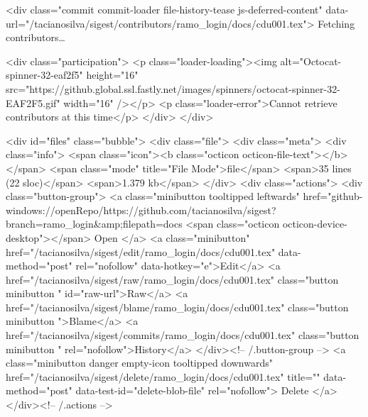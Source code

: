  <div class="commit commit-loader file-history-tease js-deferred-content" data-url="/tacianosilva/sigest/contributors/ramo_login/docs/cdu001.tex">
    Fetching contributors…

    <div class="participation">
      <p class="loader-loading"><img alt="Octocat-spinner-32-eaf2f5" height="16" src="https://github.global.ssl.fastly.net/images/spinners/octocat-spinner-32-EAF2F5.gif" width="16" /></p>
      <p class="loader-error">Cannot retrieve contributors at this time</p>
    </div>
  </div>

<div id="files" class="bubble">
  <div class="file">
    <div class="meta">
      <div class="info">
        <span class="icon"><b class="octicon octicon-file-text"></b></span>
        <span class="mode" title="File Mode">file</span>
          <span>35 lines (22 sloc)</span>
        <span>1.379 kb</span>
      </div>
      <div class="actions">
        <div class="button-group">
            <a class="minibutton tooltipped leftwards"
               href="github-windows://openRepo/https://github.com/tacianosilva/sigest?branch=ramo_login&amp;filepath=docs%
                <span class="octicon octicon-device-desktop"></span> Open
            </a>
                <a class="minibutton"
                   href="/tacianosilva/sigest/edit/ramo_login/docs/cdu001.tex"
                   data-method="post" rel="nofollow" data-hotkey="e">Edit</a>
          <a href="/tacianosilva/sigest/raw/ramo_login/docs/cdu001.tex" class="button minibutton " id="raw-url">Raw</a>
            <a href="/tacianosilva/sigest/blame/ramo_login/docs/cdu001.tex" class="button minibutton ">Blame</a>
          <a href="/tacianosilva/sigest/commits/ramo_login/docs/cdu001.tex" class="button minibutton " rel="nofollow">History</a>
        </div><!-- /.button-group -->
          <a class="minibutton danger empty-icon tooltipped downwards"
             href="/tacianosilva/sigest/delete/ramo_login/docs/cdu001.tex"
             title=""
             data-method="post" data-test-id="delete-blob-file" rel="nofollow">
          Delete
        </a>
      </div><!-- /.actions -->

